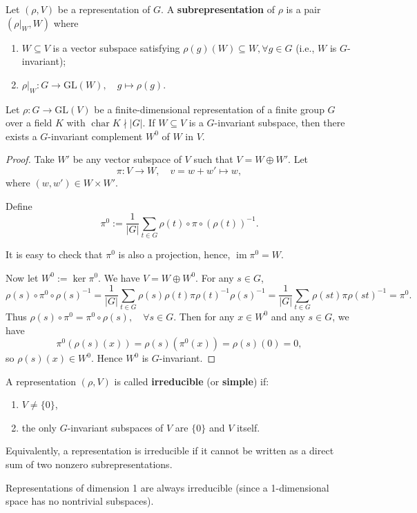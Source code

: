 \begin{defn}[Subrepresentation]
Let \((\rho,V)\) be a representation of \(G\). A \textbf{subrepresentation} of \(\rho\) is a pair \((\rho|_W,W)\) where
\begin{enumerate}
    \item \(W \subseteq V\) is a vector subspace satisfying \(\rho(g)(W) \subseteq W,\forall g \in G\) (i.e., $W$ is $G$-invariant);
    \item \(\rho|_W : G \to \mathrm{GL}(W),\quad g\mapsto \rho(g)\).
\end{enumerate}
\end{defn}

\begin{thm}\label{existence of invariant complement}
Let \(\rho: G \to \mathrm{GL}(V)\) be a finite-dimensional representation of a finite group \(G\) over a field \(K\) with \(\operatorname{char} K \nmid |G|\). If \(W \subseteq V\) is a \(G\)-invariant subspace, then there exists a \(G\)-invariant complement \(W^0\) of \(W\) in \(V\).
\end{thm}

\begin{proof}

Take \(W'\) be any vector subspace of \(V\) such that \(V = W \oplus W'\). 
Let \[\pi: V \to W,\quad v=w+w'\mapsto w,\]
where $(
w,w')\in W\times W'$.

Define
\[
\pi^0 := \frac{1}{|G|} \sum_{t \in G} \rho(t )\circ \pi \circ (\rho(t))^{-1}.
\]

It is easy to check that \(\pi^0\) is also a projection, hence, \(\operatorname{im}\pi^0=W\). 

Now let \(W^0 := \ker \pi^0\). We have \(V = W \oplus W^0\). For any \(s \in G\),
\[
\rho(s) \circ \pi^0 \circ \rho(s)^{-1}
= \frac{1}{|G|} \sum_{t \in G} \rho(s) \rho(t) \pi \rho(t)^{-1} \rho(s)^{-1}
= \frac{1}{|G|} \sum_{t \in G} \rho(st) \pi \rho(st)^{-1}
= \pi^0.
\]
Thus \(\rho(s) \circ \pi^0 = \pi^0 \circ \rho(s),\quad\forall s\in G\).
Then for any \(x \in W^0\) and any \(s \in G\), we have
\[
\pi^0(\rho(s) (x)) = \rho(s)(\pi^0( x)) = \rho(s)(0) = 0,
\]
so \(\rho(s)(x) \in W^0\). Hence \(W^0\) is \(G\)-invariant.
\end{proof}


\begin{defn}
A representation \((\rho, V)\) is called \textbf{irreducible} (or \textbf{simple}) if:
\begin{enumerate}
    \item \(V \neq \{0\}\), 
    \item the only \(G\)-invariant subspaces of \(V\) are \(\{0\}\) and \(V\) itself.
\end{enumerate}


Equivalently, a representation is irreducible if it cannot be written as a direct sum of two nonzero subrepresentations. 
\end{defn}
\begin{exmp}
Representations of dimension 1 are always irreducible (since a 1-dimensional space has no nontrivial subspaces).
\end{exmp}


